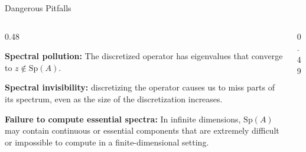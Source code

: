 \documentclass[aspectratio=169]{beamer}
\begin{document}
\begin{frame}{Dangerous Pitfalls}

    

\begin{columns}[T,onlytextwidth]

\begin{column}{0.48\textwidth}
\small

\textbf{Spectral pollution:}  
The discretized operator has eigenvalues that converge to $z \notin \text{Sp}(A).$

\vspace{2em}

\textbf{Spectral invisibility:}  
discretizing the operator causes us to miss parts of its spectrum,
even as the size of the discretization increases.


\vspace{2em}

\textbf{Failure to compute essential spectra:}  
In infinite dimensions, $\text{Sp}(A)$ may contain continuous or essential components that are extremely difficult or impossible to compute in a finite-dimensional setting.

\end{column}

\begin{column}{0.49\textwidth}
\centering
{}
\end{column}
\end{columns}
\end{frame}
\end{document}
